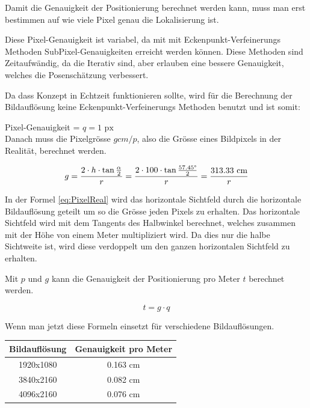 Damit die Genauigkeit der Positionierung berechnet werden kann, muss man erst bestimmen auf wie viele Pixel genau die Lokalisierung ist.

Diese Pixel-Genauigkeit ist variabel, da mit mit Eckenpunkt-Verfeinerungs Methoden SubPixel-Genauigkeiten erreicht werden können.
Diese Methoden sind Zeitaufwändig, da die Iterativ sind, aber erlauben eine bessere Genauigkeit, welches die Posenschätzung verbessert.

Da dass Konzept in Echtzeit funktionieren sollte, wird für die Berechnung der Bildauflösung keine Eckenpunkt-Verfeinerungs Methoden benutzt und ist somit:


Pixel-Genauigkeit = \(q = 1\text{ px}\)\\

Danach muss die Pixelgrösse \(g cm/p\), also die Grösse eines Bildpixels in der Realität, berechnet werden.

\begin{equation}
g = \frac{2 \cdot h \cdot \tan\frac{\alpha}{2}}{r} = \frac{2 \cdot 100 \cdot \tan\frac{57.45\degree}{2}}{r} = \frac{313.33\text{ cm}}{r}
\label{eq:PixelReal}
\end{equation}

In der Formel \ref{eq:PixelReal} wird das horizontale Sichtfeld durch die horizontale Bildauflösung geteilt um so die Grösse jeden Pixels zu erhalten.
Das horizontale Sichtfeld wird mit dem Tangents des Halbwinkel berechnet, welches zusammen mit der Höhe von einem Meter multipliziert wird.
Da dies nur die halbe Sichtweite ist, wird diese verdoppelt um den ganzen horizontalen Sichtfeld zu erhalten.

Mit \(p\) und \(g\) kann die Genauigkeit der Positionierung pro Meter \(t\)  berechnet werden.

\begin{equation}
t = g \cdot q
\label{eq:precision}
\end{equation}

Wenn man jetzt diese Formeln einsetzt für verschiedene Bildauflösungen.

\begin{center}
    \begin{tabular}{ c c}
    \label{tab:resolutions}
     Bildauflösung & Genauigkeit pro Meter\\ 
     \hline
     1920x1080 & 0.163 cm \\  
     3840x2160 & 0.082 cm \\
     4096x2160 & 0.076 cm \\ 
\end{tabular}
\end{center}


